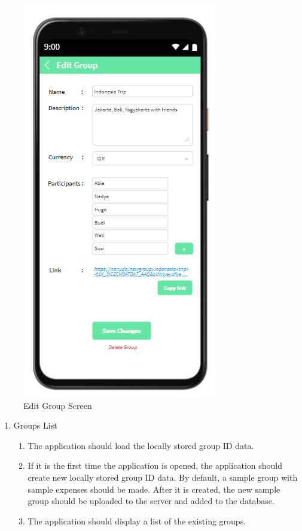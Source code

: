\documentclass[conference]{IEEEtran}
\begin{document}
\begin{enumerate}
\begin{figure}[H]
                \centerline{\includegraphics[scale=0.6]{img/ui/group-edit.png}}
                \caption{Edit Group Screen}
                \label{fig:edit-group-screen}
            \end{figure}
            \begin{enumerate}
                \item Groups List
                    \begin{enumerate}
                        \item The application should load the locally stored group ID data.
                        \item If it is the first time the application is opened, the application should create new locally stored group ID data. By default, a sample group with sample expenses should be made. After it is created, the new sample group should be uploaded to the server and added to the database.
                        \item The application should display a list of the existing groups.

\end{enumerate}
\end{enumerate}
\end{enumerate}
\end{document}
